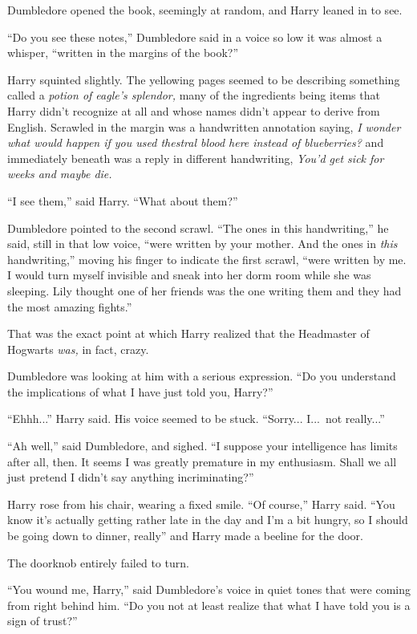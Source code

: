 Dumbledore opened the book, seemingly at random, and Harry leaned in to see.

“Do you see these notes,” Dumbledore said in a voice so low it was almost a whisper, “written in the margins of the book?”

Harry squinted slightly. The yellowing pages seemed to be describing something called a \emph{potion of eagle’s splendor,} many of the ingredients being items that Harry didn’t recognize at all and whose names didn’t appear to derive from English. Scrawled in the margin was a handwritten annotation saying, \emph{I wonder what would happen if you used thestral blood here instead of blueberries?} and immediately beneath was a reply in different handwriting, \emph{You’d get sick for weeks and maybe die.}

“I see them,” said Harry. “What about them?”

Dumbledore pointed to the second scrawl. “The ones in this handwriting,” he said, still in that low voice, “were written by your mother. And the ones in \emph{this} handwriting,” moving his finger to indicate the first scrawl, “were written by me. I would turn myself invisible and sneak into her dorm room while she was sleeping. Lily thought one of her friends was the one writing them and they had the most amazing fights.”

That was the exact point at which Harry realized that the Headmaster of Hogwarts \emph{was,} in fact, crazy.

Dumbledore was looking at him with a serious expression. “Do you understand the implications of what I have just told you, Harry?”

“Ehhh...” Harry said. His voice seemed to be stuck. “Sorry... I...\ not really...”

“Ah well,” said Dumbledore, and sighed. “I suppose your intelligence has limits after all, then. It seems I was greatly premature in my enthusiasm. Shall we all just pretend I didn’t say anything incriminating?”

Harry rose from his chair, wearing a fixed smile. “Of course,” Harry said. “You know it’s actually getting rather late in the day and I’m a bit hungry, so I should be going down to dinner, really” and Harry made a beeline for the door.

The doorknob entirely failed to turn.

“You wound me, Harry,” said Dumbledore’s voice in quiet tones that were coming from right behind him. “Do you not at least realize that what I have told you is a sign of trust?”

